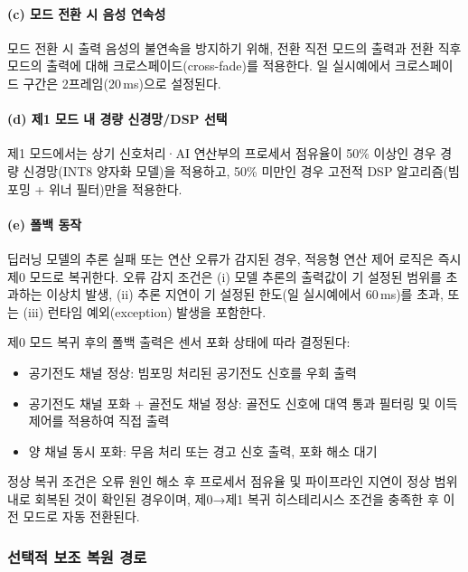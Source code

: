 \documentclass{article}
\begin{document}
\paragraph{(c) 모드 전환 시 음성 연속성}

모드 전환 시 출력 음성의 불연속을 방지하기 위해, 전환 직전 모드의 출력과 전환 직후 모드의 출력에 대해 크로스페이드(cross-fade)를 적용한다. 일 실시예에서 크로스페이드 구간은 2프레임(20\,ms)으로 설정된다.

\paragraph{(d) 제1 모드 내 경량 신경망/DSP 선택}

제1 모드에서는 상기 신호처리·AI 연산부의 프로세서 점유율이 50\% 이상인 경우 경량 신경망(INT8 양자화 모델)을 적용하고, 50\% 미만인 경우 고전적 DSP 알고리즘(빔포밍 + 위너 필터)만을 적용한다.

\paragraph{(e) 폴백 동작}

딥러닝 모델의 추론 실패 또는 연산 오류가 감지된 경우, 적응형 연산 제어 로직은 즉시 제0 모드로 복귀한다. 오류 감지 조건은 (i) 모델 추론의 출력값이 기 설정된 범위를 초과하는 이상치 발생, (ii) 추론 지연이 기 설정된 한도(일 실시예에서 60\,ms)를 초과, 또는 (iii) 런타임 예외(exception) 발생을 포함한다.

제0 모드 복귀 후의 폴백 출력은 센서 포화 상태에 따라 결정된다:
\begin{itemize}
    \item 공기전도 채널 정상: 빔포밍 처리된 공기전도 신호를 우회 출력
    \item 공기전도 채널 포화 + 골전도 채널 정상: 골전도 신호에 대역 통과 필터링 및 이득 제어를 적용하여 직접 출력
    \item 양 채널 동시 포화: 무음 처리 또는 경고 신호 출력, 포화 해소 대기
\end{itemize}

정상 복귀 조건은 오류 원인 해소 후 프로세서 점유율 및 파이프라인 지연이 정상 범위 내로 회복된 것이 확인된 경우이며, 제0→제1 복귀 히스테리시스 조건을 충족한 후 이전 모드로 자동 전환된다.

\subsubsection{선택적 보조 복원 경로}
\end{document}
